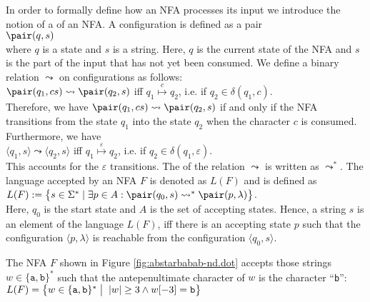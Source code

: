 In order to formally define how an \textsc{NFA} processes its input we introduce the notion of a
  of an \textsc{NFA}.  A configuration
is defined as a pair
\\[0.2cm]
\hspace*{1.3cm}
$\pair(q, s)$
\\[0.2cm]
where  $q$ is a state and $s$ is a  string.  Here, $q$ is the current state of
the \textsc{NFA} and $s$ is the part of the input that has not yet been
consumed.  We define a binary relation
$\leadsto$ \index{$\leadsto$} on configurations as follows:
\\[0.2cm]
\hspace*{1.3cm}
$\pair(q_1, cs) \leadsto \pair(q_2, s)$ \quad iff \quad $q_1 \stackrel{c}{\mapsto} q_2$, \quad i.e. if $q_2 \in\delta(q_1, c)$.
\\[0.2cm]
Therefore, we have $\pair(q_1,cs) \leadsto \pair(q_2, s)$ if and only
if the \textsc{NFA} transitions from the state
$q_1$ into the state $q_2$ when the character $c$ is consumed.
Furthermore, we have
\\[0.2cm]
\hspace*{1.3cm}
$\langle q_1, s \rangle \leadsto \langle q_2, s \rangle$ \quad iff \quad $q_1 \stackrel{\varepsilon}{\mapsto}
q_2$, \quad i.e. if $q_2 \in \delta(q_1, \varepsilon)$.
\\[0.2cm]
This accounts for the $\varepsilon$ transitions.  The
 of the relation $\leadsto$ is written as $\leadsto^*$.
The language accepted by an \textsc{NFA} $F$ is
denoted as $L(F)$ and is defined as
\\[0.2cm]
\hspace*{1.3cm}
$L(F) := \bigl\{ s \in \Sigma^* \mid  
                 \exists p \in A : \pair(q_0,s) \leadsto^* \pair(p,\lambda) \bigr\}$.
\\[0.2cm]
Here,  $q_0$ is the  start state and $A$ is the set of accepting
states.  Hence, a string  $s$ is an element of the language  $L(F)$,  
iff there is an accepting state $p$ such that the configuration $\langle p, \lambda \rangle$ is reachable from the configuration $\langle q_0, s \rangle$.

\exampleEng 
The \textsc{NFA} $F$ shown in Figure \ref{fig:abstarbabab-nd.dot} accepts
those strings $w \in \{ \mathtt{a}, \mathtt{b} \}^*$ such that the
antepenultimate character of $w$ is  the character ``\texttt{b}'':
\\[0.2cm]
\hspace*{1.3cm}
$L(F) = \bigl\{ w \in \{ \mathtt{a}, \mathtt{b} \}^* \bigm|\; |w| \geq 3 \wedge w[-3] = \mathtt{b} \bigr\}$
 \eox
\vspace*{0.3cm}

